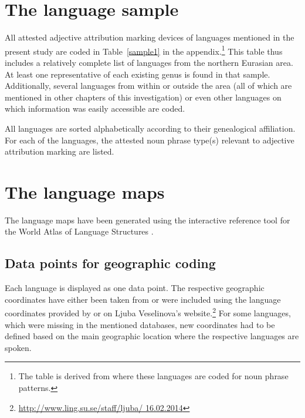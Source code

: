 \section{The language sample}
All attested adjective attribution marking devices of languages mentioned in the present study are coded in Table~\ref{sample1} in the appendix.\footnote{The table is derived from \citet{AUTOTYP-NP} where these languages are coded for noun phrase patterns.} This table thus includes a relatively complete list of languages from the northern Eurasian area. At least one representative of each existing genus is found in that sample. Additionally, several languages from within or outside the area (all of which are mentioned in other chapters of this investigation) or even other languages on which information was easily accessible are coded.

All languages are sorted alphabetically according to their genealogical affiliation. For each of the languages, the attested noun phrase type(s) relevant to adjective attribution marking are listed.

\section{The language maps}
The language maps have been generated using the interactive reference tool 
for the World Atlas of Language Structures \citep{bibiko2005}. 

\subsection[Geographic coding]{Data points for geographic coding}
Each language is displayed as one data point. The respective geographic coordinates have either been taken from \cite{walsOnline2013} or were included using the language coordinates provided by \cite{AUTOTYP} or on Ljuba Veselinova's website.\footnote{\url{http://www.ling.su.se/staff/ljuba/ 16.02.2014}} For some languages, which were missing in the mentioned databases, new coordinates had to be defined based on the main geographic location where the respective languages are spoken.

